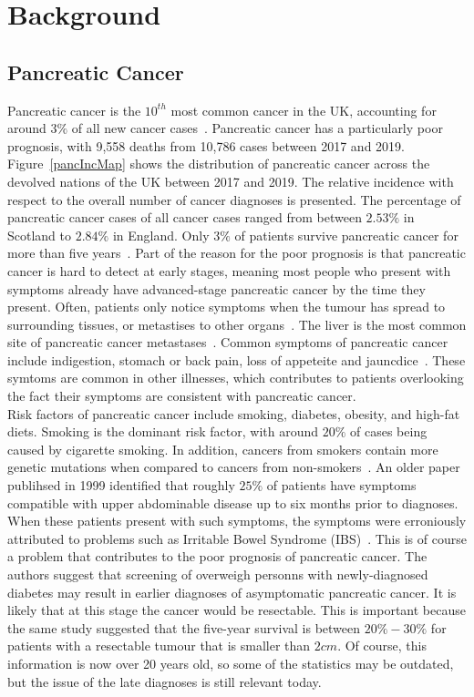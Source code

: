 \chapter{Background}\label{backChap}

\section{Pancreatic Cancer}
Pancreatic cancer is the $10^{th}$ most common cancer in the UK, accounting for around $3\%$ of all new cancer cases~\cite{pancStat}. Pancreatic cancer has a particularly poor prognosis, with 9,558 deaths from 10,786 cases between 2017 and 2019. Figure~\ref{pancIncMap} shows the distribution of pancreatic cancer across the devolved nations of the UK between 2017 and 2019. The relative incidence with respect to the overall number of cancer diagnoses is presented. The percentage of pancreatic cancer cases of all cancer cases ranged from between $2.53\%$ in Scotland to $2.84\%$ in England. Only $3\%$ of patients survive pancreatic cancer for more than five years~\cite{NG85}. Part of the reason for the poor prognosis is that pancreatic cancer is hard to detect at early stages, meaning most people who present with symptoms already have advanced-stage pancreatic cancer by the time they present. Often, patients only notice symptoms when the tumour has spread to surrounding tissues, or metastises to other organs~\cite{kelsen}. The liver is the most common site of pancreatic cancer metastases~\cite{deeb}. Common symptoms of pancreatic cancer include indigestion, stomach or back pain, loss of appeteite and jauncdice~\cite{pancSymp}. These symtoms are common in other illnesses, which contributes to patients overlooking the fact their symptoms are consistent with pancreatic cancer. \\

Risk factors of pancreatic cancer include smoking, diabetes, obesity, and high-fat diets. Smoking is the dominant risk factor, with around $20\%$ of cases being caused by cigarette smoking. In addition, cancers from smokers contain more genetic mutations when compared to cancers from non-smokers~\cite{blackford}. An older paper publihsed in 1999 identified that roughly $25\%$ of patients have symptoms compatible with upper abdominable disease up to six months prior to diagnoses. When these patients present with such symptoms, the symptoms were erroniously attributed to problems such as Irritable Bowel Syndrome (IBS)~\cite{dimagno}. This is of course a problem that contributes to the poor prognosis of pancreatic cancer. The authors suggest that screening of overweigh personns with newly-diagnosed diabetes may result in earlier diagnoses of asymptomatic pancreatic cancer. It is likely that at this stage the cancer would be resectable. This is important because the same study suggested that the five-year survival is between $20\%-30\%$ for patients with a resectable tumour that is smaller than $2cm$. Of course, this information is now over 20 years old, so some of the statistics may be outdated, but the issue of the late diagnoses is still relevant today. \\

